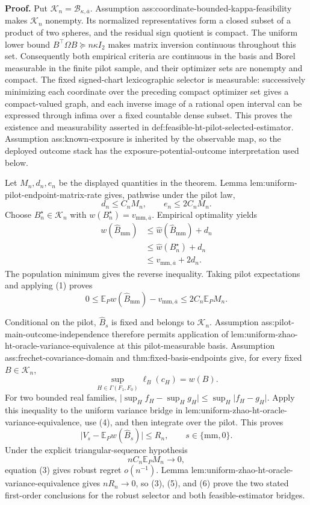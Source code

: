 \textbf{Proof.}
Put \(\mathcal K_n=\mathcal B_{\kappa,\overline a}\).  Assumption ass:coordinate-bounded-kappa-feasibility makes \(\mathcal K_n\) nonempty.  Its normalized representatives form a closed subset of a product of two spheres, and the residual sign quotient is compact.  The uniform lower bound \(B^{\top}\Omega B\succeq n\kappa I_2\) makes matrix inversion continuous throughout this set.  Consequently both empirical criteria are continuous in the basis and Borel measurable in the finite pilot sample, and their optimizer sets are nonempty and compact.  The fixed signed-chart lexicographic selector is measurable: successively minimizing each coordinate over the preceding compact optimizer set gives a compact-valued graph, and each inverse image of a rational open interval can be expressed through infima over a fixed countable dense subset.  This proves the existence and measurability asserted in def:feasible-ht-pilot-selected-estimator.  Assumption ass:known-exposure is inherited by the observable map, so the deployed outcome stack has the exposure-potential-outcome interpretation used below.

Let \(M_n,d_n,e_n\) be the displayed quantities in the theorem.  Lemma lem:uniform-pilot-endpoint-matrix-rate gives, pathwise under the pilot law,
\[
d_n\le C_nM_n,
\qquad
e_n\le2C_nM_n.
\tag{1}
\]
Choose \(B_n^\star\in\mathcal K_n\) with \(w(B_n^\star)=v_{\mathrm{mm},\overline a}\).  Empirical optimality yields
\[
\begin{aligned}
w(\widehat B_{\mathrm{mm}})
&\le\widehat w(\widehat B_{\mathrm{mm}})+d_n\\
&\le\widehat w(B_n^\star)+d_n\\
&\le v_{\mathrm{mm},\overline a}+2d_n.
\end{aligned}
\tag{2}
\]
The population minimum gives the reverse inequality.  Taking pilot expectations and applying (1) proves
\[
0\le\mathbb E_Pw(\widehat B_{\mathrm{mm}})-v_{\mathrm{mm},\overline a}
\le2C_n\mathbb E_PM_n.
\tag{3}
\]

Conditional on the pilot, \(\widehat B_s\) is fixed and belongs to \(\mathcal K_n\).  Assumption ass:pilot-main-outcome-independence therefore permits application of lem:uniform-zhao-ht-oracle-variance-equivalence at this pilot-measurable basis.  Assumption ass:frechet-covariance-domain and thm:fixed-basis-endpoints give, for every fixed \(B\in\mathcal K_n\),
\[
\sup_{H\in\Gamma(F_1,F_0)}\ell_B(c_H)=w(B).
\tag{4}
\]
For two bounded real families, \(\lvert\sup_H f_H-\sup_H g_H\rvert\le\sup_H\lvert f_H-g_H\rvert\).  Apply this inequality to the uniform variance bridge in lem:uniform-zhao-ht-oracle-variance-equivalence, use (4), and then integrate over the pilot.  This proves
\[
\lvert V_s-\mathbb E_Pw(\widehat B_s)\rvert\le R_n,
\qquad s\in\{\mathrm{mm},0\}.
\tag{5}
\]
Under the explicit triangular-sequence hypothesis
\[
nC_n\mathbb E_PM_n\longrightarrow0,
\tag{6}
\]
equation (3) gives robust regret \(o(n^{-1})\).  Lemma lem:uniform-zhao-ht-oracle-variance-equivalence gives \(nR_n\to0\), so (3), (5), and (6) prove the two stated first-order conclusions for the robust selector and both feasible-estimator bridges.

